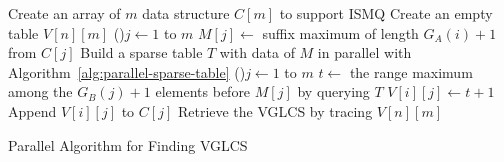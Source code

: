 \begin{algorithm}[H]
\SetAlgoNoLine
\LinesNumbered
{}
    
Create an array of $m$ data structure $C[m]$ to support ISMQ \;
Create an empty table $V[n][m]$ \;
 {
  \ForPar(){$j \gets 1$ to $m$} {
    $M[j] \gets$ suffix maximum of length $G_A(i) + 1$ from $C[j]$ \;
  }
  Build a sparse table $T$ with data of $M$ in parallel with Algorithm~\ref{alg:parallel-sparse-table}\; 
  \ForPar(){$j \gets 1$ to $m$} {
     {
        $t \gets $ the range maximum among the $G_B(j) + 1$ elements before $M[j]$ by querying $T$ \;
        $V[i][j] \gets t + 1$ \;
        Append $V[i][j]$ to $C[j]$ \;
    }
  }
}
Retrieve the VGLCS by tracing $V[n][m]$ \;
  \caption{Parallel Algorithm for Finding VGLCS}
  \label{alg:parallel-VGLCS}
\end{algorithm}

